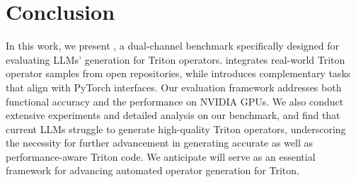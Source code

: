 \section{Conclusion}

In this work, we present \benchall, a dual-channel benchmark specifically designed for evaluating LLMs' generation for Triton operators. \benchone integrates real-world Triton operator samples from open repositories, while \benchtwo introduces complementary tasks that align with PyTorch interfaces. Our evaluation framework addresses both functional accuracy and the performance on NVIDIA GPUs. 
We also conduct extensive experiments and detailed analysis on our benchmark, and find that current LLMs struggle to generate high-quality Triton operators, underscoring the necessity for further advancement in generating accurate as well as performance-aware Triton code. 
We anticipate \benchall will serve as an essential framework for advancing automated operator generation for Triton.